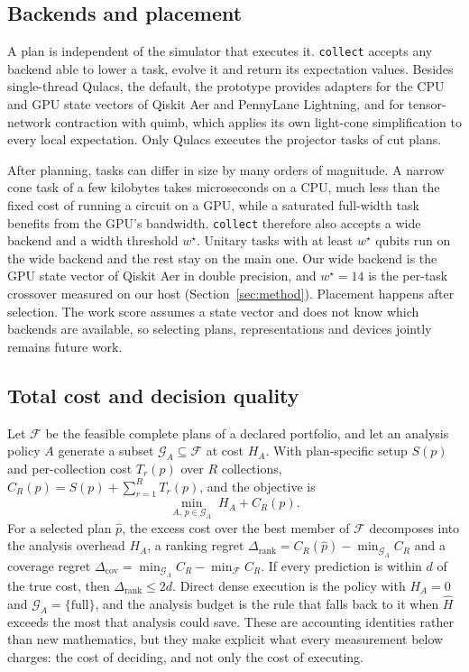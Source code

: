 \subsection{Backends and placement}
A plan is independent of the simulator that executes it. \texttt{collect} accepts any backend able to lower a task, evolve it and return its expectation values. Besides single-thread Qulacs, the default, the prototype provides adapters for the CPU and GPU state vectors of Qiskit Aer and PennyLane Lightning, and for tensor-network contraction with quimb, which applies its own light-cone simplification to every local expectation. Only Qulacs executes the projector tasks of cut plans.

After planning, tasks can differ in size by many orders of magnitude. A narrow cone task of a few kilobytes takes microseconds on a CPU, much less than the fixed cost of running a circuit on a GPU, while a saturated full-width task benefits from the GPU's bandwidth. \texttt{collect} therefore also accepts a wide backend and a width threshold $w^\star$. Unitary tasks with at least $w^\star$ qubits run on the wide backend and the rest stay on the main one. Our wide backend is the GPU state vector of Qiskit Aer in double precision, and $w^\star=14$ is the per-task crossover measured on our host (Section~\ref{sec:method}). Placement happens after selection. The work score assumes a state vector and does not know which backends are available, so selecting plans, representations and devices jointly remains future work.

\subsection{Total cost and decision quality}
Let $\mathcal{F}$ be the feasible complete plans of a declared portfolio, and let an analysis policy $A$ generate a subset $\mathcal{G}_A\subseteq\mathcal{F}$ at cost $H_A$. With plan-specific setup $S(p)$ and per-collection cost $T_r(p)$ over $R$ collections, $C_R(p)=S(p)+\sum_{r=1}^R T_r(p)$, and the objective is
\begin{equation}
\min_{A,\,p\in\mathcal{G}_A}\;H_A+C_R(p).
\label{eq:planning-objective}
\end{equation}
For a selected plan $\hat p$, the excess cost over the best member of $\mathcal{F}$ decomposes into the analysis overhead $H_A$, a ranking regret $\Delta_{\mathrm{rank}}=C_R(\hat p)-\min_{\mathcal{G}_A}C_R$ and a coverage regret $\Delta_{\mathrm{cov}}=\min_{\mathcal{G}_A}C_R-\min_{\mathcal{F}}C_R$. If every prediction is within $d$ of the true cost, then $\Delta_{\mathrm{rank}}\le 2d$. Direct dense execution is the policy with $H_A=0$ and $\mathcal{G}_A=\{\text{full}\}$, and the analysis budget is the rule that falls back to it when $\widehat H$ exceeds the most that analysis could save. These are accounting identities rather than new mathematics, but they make explicit what every measurement below charges: the cost of deciding, and not only the cost of executing.

